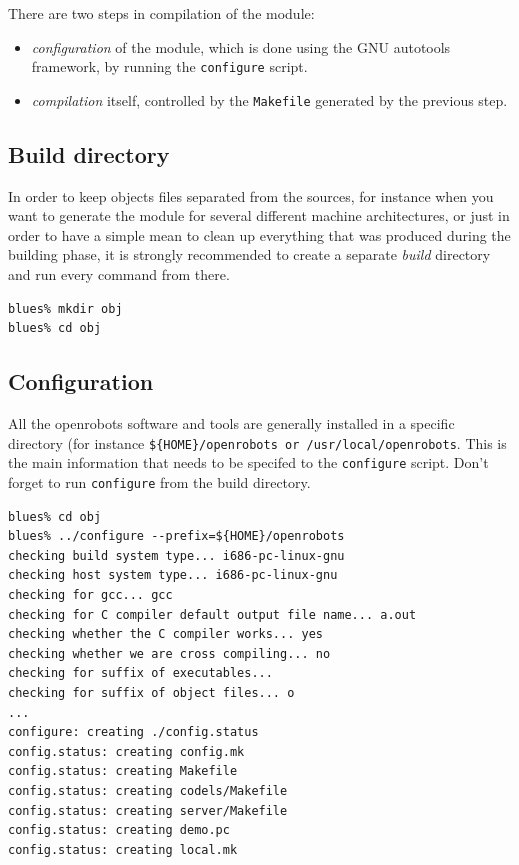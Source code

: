 There are two steps in compilation of the module:
\begin{itemize}
\item \emph{configuration} of the module, which is done using the GNU
autotools framework, by running the \texttt{configure} script.
\item \emph{compilation} itself, controlled by the \texttt{Makefile}
generated by the previous step. 
\end{itemize}

\subsection{Build directory}
In order to keep objects files separated from the sources, for
instance when you want to generate the module for several different
machine architectures, or just in order to have a simple mean to clean
up everything that was produced during the building phase, it is
strongly recommended to create a separate \emph{build} directory and
run every command from there. 

\begin{center}
\begin{cartouche}\small
\begin{verbatim}
blues% mkdir obj
blues% cd obj
\end{verbatim}
\end{cartouche}
\end{center}

\subsection{Configuration}

All the  openrobots software  and tools are  generally  installed in a specific
directory           (for       instance    \texttt{\$\{HOME\}/openrobots     or
\texttt{/usr/local/openrobots}}. This is the  main information that needs to be
specifed to the \texttt{configure} script. Don't forget to run
\texttt{configure} from the build directory.

\begin{center}
\begin{cartouche}\small
\begin{verbatim}
blues% cd obj
blues% ../configure --prefix=${HOME}/openrobots
checking build system type... i686-pc-linux-gnu
checking host system type... i686-pc-linux-gnu
checking for gcc... gcc
checking for C compiler default output file name... a.out
checking whether the C compiler works... yes
checking whether we are cross compiling... no
checking for suffix of executables... 
checking for suffix of object files... o
...
configure: creating ./config.status
config.status: creating config.mk
config.status: creating Makefile
config.status: creating codels/Makefile
config.status: creating server/Makefile
config.status: creating demo.pc
config.status: creating local.mk
\end{verbatim}
\end{cartouche}
\end{center}

